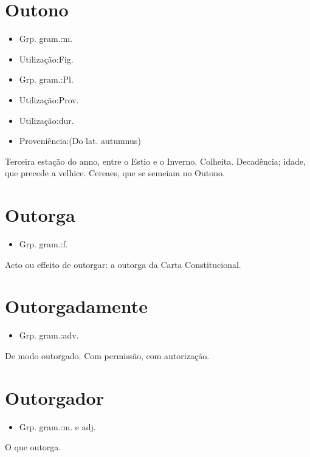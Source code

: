 \section{Outono}
\begin{itemize}
\item {Grp. gram.:m.}
\end{itemize}
\begin{itemize}
\item {Utilização:Fig.}
\end{itemize}
\begin{itemize}
\item {Grp. gram.:Pl.}
\end{itemize}
\begin{itemize}
\item {Utilização:Prov.}
\end{itemize}
\begin{itemize}
\item {Utilização:dur.}
\end{itemize}
\begin{itemize}
\item {Proveniência:(Do lat. \textunderscore autumnus\textunderscore )}
\end{itemize}
Terceira estação do anno, entre o Estio e o Inverno.
Colheita.
Decadência; idade, que precede a velhice.
Cereaes, que se semeiam no Outono.
\section{Outorga}
\begin{itemize}
\item {Grp. gram.:f.}
\end{itemize}
Acto ou effeito de outorgar: \textunderscore a outorga da Carta Constitucional\textunderscore .
\section{Outorgadamente}
\begin{itemize}
\item {Grp. gram.:adv.}
\end{itemize}
De modo outorgado.
Com permissão, com autorização.
\section{Outorgador}
\begin{itemize}
\item {Grp. gram.:m.  e  adj.}
\end{itemize}
O que outorga.
